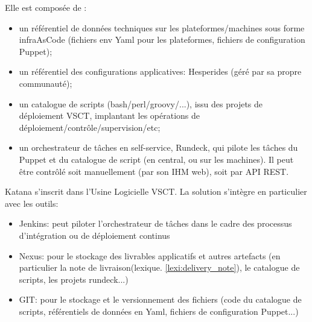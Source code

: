 Elle est composée de :

\begin{itemize}
 \item un référentiel de données techniques sur les plateformes/machines sous forme infraAsCode (fichiers env Yaml pour les plateformes, fichiers de configuration Puppet);
 \item un référentiel des configurations applicatives: Hesperides (géré par sa propre communauté);
 \item un catalogue de scripts (bash/perl/groovy/...), issu des projets de déploiement VSCT, implantant les opérations de déploiement/contrôle/supervision/etc;
 \item un orchestrateur de tâches en self-service, Rundeck, qui pilote les tâches du Puppet et du catalogue de script (en central, ou sur les machines). Il peut être contrôlé soit manuellement (par son IHM web), soit par API REST.
\end{itemize}

Katana s'inscrit dans l'Usine Logicielle VSCT. La solution s'intègre en particulier avec les outils:
\begin{itemize}
 \item Jenkins: peut piloter l'orchestrateur de tâches dans le cadre des processus d'intégration ou de déploiement continus
 \item Nexus: pour le stockage des livrables applicatifs et autres artefacts (en particulier la note de livraison(lexique. \ref{lexi:delivery_note}), le catalogue de scripts, les projets rundeck...)
 \item GIT: pour le stockage et le versionnement des fichiers (code du catalogue de scripts, référentiels de données en Yaml, fichiers de configuration Puppet...)
\end{itemize}
